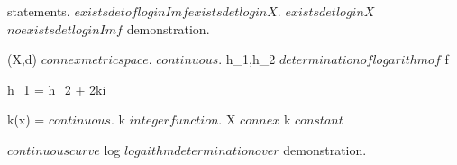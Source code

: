 \documentclass[../Main/main]{subfiles}
\begin{document}
{	
	{
		{
			statements.
		}
		\holds
		{
			$exists det of log in Im f $\imp $ exists det log in X $.
			$exists det log in X $\suchthat $no exists det log in Im f$
		}
		\demonstration
		{
			demonstration.
		}
	}
	
	
	{
		{
			(X,d) $ connex metric space $.
			 $ continuous $.
			h_1,h_2 $ determination of logarithm of $ f
		}
		\holds
		{
			{
				h_1 = h_2 + 2k\pi i
			}
			
		}
		\demonstration
		{
			{
				k(x) =  $ continuous $.
				k $integer function $.
				X $connex $ \imp k $ constant $
			}
		}
	}
	
	
	{
		{
			\function{ \gamma }{ [a,b] }{ \C \nonzero } $ continuous curve $
		}
		\holds
		{
			{
				log $ logaithm determination over $ \gamma*
			}
		}
		\demonstration
		{
			demonstration.
		}
	}
	
	
	
	
	
	
	
	

}
\end{document}
